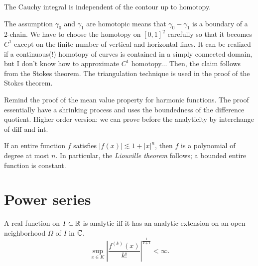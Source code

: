 \documentclass{../../large}
\begin{document}
\begin{prb}
The Cauchy integral is independent of the contour up to homotopy.
\end{prb}
\begin{pf}
The assumption $\gamma_0$ and $\gamma_1$ are homotopic means that $\gamma_0-\gamma_1$ is a boundary of a 2-chain.
We have to choose the homotopy on $[0,1]^2$ carefully so that it becomes $C^1$ except on the finite number of vertical and horizontal lines.
It can be realized if a continuous(!) homotopy of curves is contained in a simply connected domain, but I don't know how to approximate $C^1$ homotopy...
Then, the claim follows from the Stokes theorem.
The triangulation technique is used in the proof of the Stokes theorem.
\end{pf}


\begin{prb}
Remind the proof of the mean value property for harmonic functions.
The proof essentially have a shrinking process and uses the boundedness of the difference quotient.
Higher order version: we can prove before the analyticity by interchange of diff and int.
\end{prb}




\begin{prb}
\begin{parts}
\item If an entire function $f$ satisfies $|f(x)|\lesssim1+|x|^n$, then $f$ is a polynomial of degree at most $n$. In particular, the \emph{Liouville theorem} follows; a bounded entire function is constant.
\end{parts}
\end{prb}



\section{Power series}

\begin{prb}
A real function on $I\subset\mathbb{R}$ is analytic iff it has an analytic extension on an open neighborhood $\Omega$ of $I$ in $\mathbb{C}$.
\[\sup_{x\in K}\left|\frac{f^{(k)}(x)}{k!}\right|^{\frac1{k+1}}<\infty.\]
\end{prb}
\end{document}
